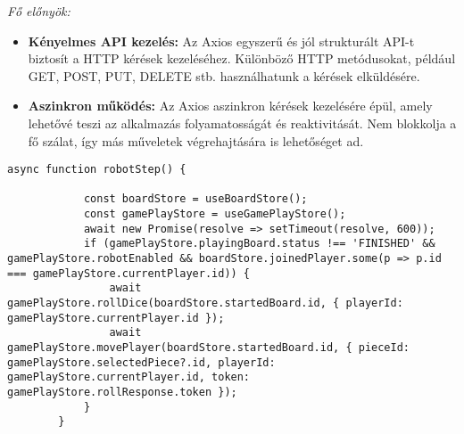 \documentclass[a4paper,twoside]{article}
\begin{document}
\textit{\large{Fő előnyök: }}
\begin{itemize}
	\item \textbf{Kényelmes API kezelés: }Az Axios egyszerű és jól strukturált API-t biztosít a
	HTTP kérések kezeléséhez. Különböző HTTP metódusokat, például GET, POST,
	PUT, DELETE stb. használhatunk a kérések elküldésére.
	\item \textbf{Aszinkron működés: } Az Axios aszinkron kérések kezelésére épül, amely
	lehetővé teszi az alkalmazás folyamatosságát és reaktivitását. Nem blokkolja a fő
	szálat, így más műveletek végrehajtására is lehetőséget ad.
\end{itemize}
\begin{adjustwidth}{0cm}{0cm}
	\begin{minipage}{\textwidth}
		\begin{lstlisting}[style=javascriptStyle,caption={HTTP kérés Axios könyvtárral}]
		async function robotStep() {
			
			const boardStore = useBoardStore();
			const gamePlayStore = useGamePlayStore();
			await new Promise(resolve => setTimeout(resolve, 600));
			if (gamePlayStore.playingBoard.status !== 'FINISHED' && gamePlayStore.robotEnabled && boardStore.joinedPlayer.some(p => p.id === gamePlayStore.currentPlayer.id)) {
				await gamePlayStore.rollDice(boardStore.startedBoard.id, { playerId: gamePlayStore.currentPlayer.id });
				await gamePlayStore.movePlayer(boardStore.startedBoard.id, { pieceId: gamePlayStore.selectedPiece?.id, playerId: gamePlayStore.currentPlayer.id, token: gamePlayStore.rollResponse.token });
			}
		}
		\end{lstlisting}
	\end{minipage}
\end{adjustwidth}

 
\end{document}
